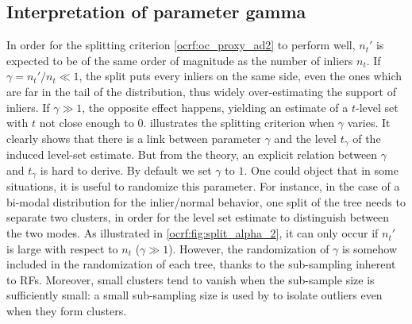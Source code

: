 \subsection{Interpretation of parameter gamma}
\label{supp:gamma_interpretation}
In order for the splitting criterion \cref{ocrf:oc_proxy_ad2} to perform well,
$n_t'$ is expected to be of the same order of magnitude as the number of
inliers $n_t$. If $\gamma = n_t'/n_t \ll 1$, the split puts every inliers on
the same side, even the ones which are far in the tail of the distribution,
thus widely over-estimating the support of inliers. If $\gamma \gg 1$, the
opposite effect happens, yielding an estimate of a $t$-level set with $t$ not
close enough to $0$.  illustrates the splitting
criterion when $\gamma$ varies. It clearly shows that there is a link between
parameter $\gamma$ and the level $t_\gamma$ of the induced level-set estimate.
But from the theory, an explicit relation between $\gamma$ and $t_\gamma$ is
hard to derive. By default we set $\gamma$ to $1$.
%
One could object that in some situations, it is useful to randomize this
parameter. For instance, in the case of a bi-modal distribution for the
inlier/normal behavior, one split of the tree needs to separate two clusters,
in order for the level set estimate to distinguish between the two modes. As
illustrated in \cref{ocrf:fig:split_alpha_2}, it can only occur if $n_t'$ is
large with respect to $n_t$ ($\gamma \gg 1$). However, the randomization of
$\gamma$ is somehow included in the randomization of each tree, thanks to the
sub-sampling inherent to \acp{RF}.
%
Moreover, small clusters tend to vanish when the sub-sample size is
sufficiently small: a small sub-sampling size is used by \citet{Liu2008} to
isolate outliers even when they form clusters.

